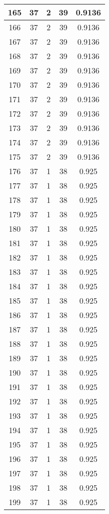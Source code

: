 \documentclass[letterpaper, 12pt]{article}
\begin{document}
\begin{longtable}{|c|c|c|c|c|}
\hline
165 & 37 & 2 & 39 & 0.9136 \\
\hline
166 & 37 & 2 & 39 & 0.9136 \\
\hline
167 & 37 & 2 & 39 & 0.9136 \\
\hline
168 & 37 & 2 & 39 & 0.9136 \\
\hline
169 & 37 & 2 & 39 & 0.9136 \\
\hline
170 & 37 & 2 & 39 & 0.9136 \\
\hline
171 & 37 & 2 & 39 & 0.9136 \\
\hline
172 & 37 & 2 & 39 & 0.9136 \\
\hline
173 & 37 & 2 & 39 & 0.9136 \\
\hline
174 & 37 & 2 & 39 & 0.9136 \\
\hline
175 & 37 & 2 & 39 & 0.9136 \\
\hline
176 & 37 & 1 & 38 & 0.925 \\
\hline
177 & 37 & 1 & 38 & 0.925 \\
\hline
178 & 37 & 1 & 38 & 0.925 \\
\hline
179 & 37 & 1 & 38 & 0.925 \\
\hline
180 & 37 & 1 & 38 & 0.925 \\
\hline
181 & 37 & 1 & 38 & 0.925 \\
\hline
182 & 37 & 1 & 38 & 0.925 \\
\hline
183 & 37 & 1 & 38 & 0.925 \\
\hline
184 & 37 & 1 & 38 & 0.925 \\
\hline
185 & 37 & 1 & 38 & 0.925 \\
\hline
186 & 37 & 1 & 38 & 0.925 \\
\hline
187 & 37 & 1 & 38 & 0.925 \\
\hline
188 & 37 & 1 & 38 & 0.925 \\
\hline
189 & 37 & 1 & 38 & 0.925 \\
\hline
190 & 37 & 1 & 38 & 0.925 \\
\hline
191 & 37 & 1 & 38 & 0.925 \\
\hline
192 & 37 & 1 & 38 & 0.925 \\
\hline
193 & 37 & 1 & 38 & 0.925 \\
\hline
194 & 37 & 1 & 38 & 0.925 \\
\hline
195 & 37 & 1 & 38 & 0.925 \\
\hline
196 & 37 & 1 & 38 & 0.925 \\
\hline
197 & 37 & 1 & 38 & 0.925 \\
\hline
198 & 37 & 1 & 38 & 0.925 \\
\hline
199 & 37 & 1 & 38 & 0.925 \\
\hline
\end{longtable}
\end{document}
